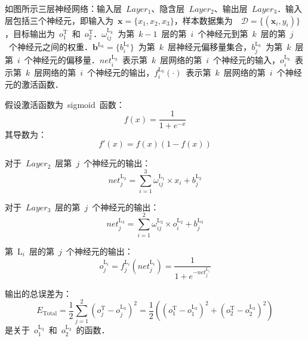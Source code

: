 \documentclass[a4paper, UTF8, heading = true, scheme = chinese, linespread = 1.66, titlepage]{ctexart}
\begin{document}
如图所示三层神经网络：输入层~$Layer_1$、隐含层~$Layer_2$、输出层~$Layer_3$．输入层包括三个神经元，即输入为~$\bm{x}=\{x_1,x_2,x_3\}$，样本数据集为~~$\mathcal{D}=\{(\bm{x}_i,y_i)\}$，目标输出为~$o^{\text{T}}_1$~和~$o^{\text{T}}_2$．$\omega^{\text{L}_k}_{ij}$~为第~$k-1$~层的第~$i$~个神经元到第~$k$~层的第~$j$~个神经元之间的权重．$\bm{b}^{\text{L}_k}=\{b^{\text{L}_k}_{i}\}$~为第~$k$~层神经元偏移量集合，$b^{\text{L}_k}_{j}$~为第~$k$~层第~$i$~个神经元的偏移量．$net^{\text{L}_k}_{i}$~表示第~$k$~层网络的第~$i$~个神经元的输入，$o^{\text{L}_k}_{i}$~表示第~$k$~层网络的第~$i$~个神经元的输出，$f^{\text{L}_k}_{i}(\cdot)$~表示第~$k$~层网络的第~$i$~个神经元的激活函数．



假设激活函数为~sigmoid~函数：
\begin{equation}
f(x) = \frac{1}{1+e^{-x}}
\end{equation}
其导数为：
\begin{equation}
f'(x) = f(x)(1-f(x))
\end{equation}


对于~$Layer_2$~层第~$j$~个神经元的输出：
\begin{equation}
net^{\text{L}_2}_{j} = \sum_{i=1}^{3}{\omega^{\text{L}_1}_{ij} \times x_i} + b^{\text{L}_2}_{j}
\end{equation}

对于~$Layer_3$~层的第~$j$~个神经元的输出：
\begin{equation}
net^{\text{L}_3}_{j} = \sum_{i=1}^{2}{\omega^{\text{L}_2}_{ij} \times o^{\text{L}_2}_i} + b^{\text{L}_3}_{j}
\end{equation}


第~$\text{L}_i$~层的第~$j$~个神经元的输出：
\begin{equation}
o^{\text{L}_i}_{j} = f^{\text{L}_i}_{j}{(net^{\text{L}_i}_j)} = \frac{1}{1+e^{-net^{\text{L}_i}_j}}
\end{equation}

输出的总误差为：
\begin{equation}
E_{\text{Total}} = \frac{1}{2}\sum_{j=1}^{2}{(o^{\text{T}}_j - o^{\text{L}_3}_{j})^2} = \frac{1}{2}((o^{\text{T}}_1 - o^{\text{L}_3}_{1})^2 + (o^{\text{T}}_2 - o^{\text{L}_3}_{2})^2)
\end{equation}
是关于~$o^{\text{L}_3}_{1}$~和~$o^{\text{L}_3}_{2}$~的函数．
\end{document}
